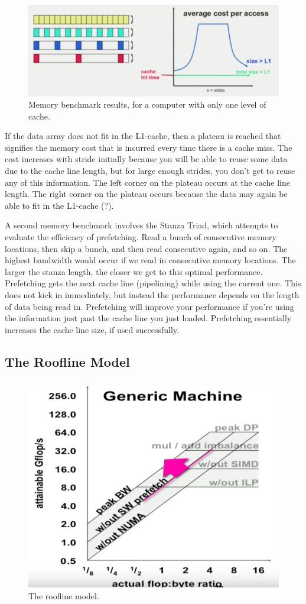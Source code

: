 \documentclass[10pt]{article}
\begin{document}
\begin{flushleft}
\begin{figure}[H]
\centering
\includegraphics[width=0.75\linewidth]{figures/membench.pdf}
\caption{Memory benchmark results, for a computer with only one level of cache.}
\end{figure}

If the data array does not fit in the L1-cache, then a plateau is reached that signifies the memory cost that is incurred every time there is a cache miss. The cost increases with stride initially because you will be able to reuse some data due to the cache line length, but for large enough strides, you don't get to reuse any of this information. The left corner on the plateau occurs at the cache line length. The right corner on the plateau occurs because the data may again be able to fit in the L1-cache (?).

A second memory benchmark involves the Stanza Triad, which attempts to evaluate the efficiency of prefetching. Read a bunch of consecutive memory locations, then skip a bunch, and then read consecutive again, and so on. The highest bandwidth would occur if we read in consecutive memory locations. The larger the stanza length, the closer we get to this optimal performance. Prefetching gets the next cache line (pipelining) while using the current one. This does not kick in immediately, but instead the performance depends on the length of data being read in. Prefetching will improve your performance if you're using the information just past the cache line you just loaded. Prefetching essentially increases the cache line size, if used successfully.

\subsection{The Roofline Model}

\begin{figure}[H]
\centering
\includegraphics[width=0.5\linewidth]{figures/roofline.pdf}
\caption{The roofline model.}
\end{figure}


\end{flushleft}
\end{document}
